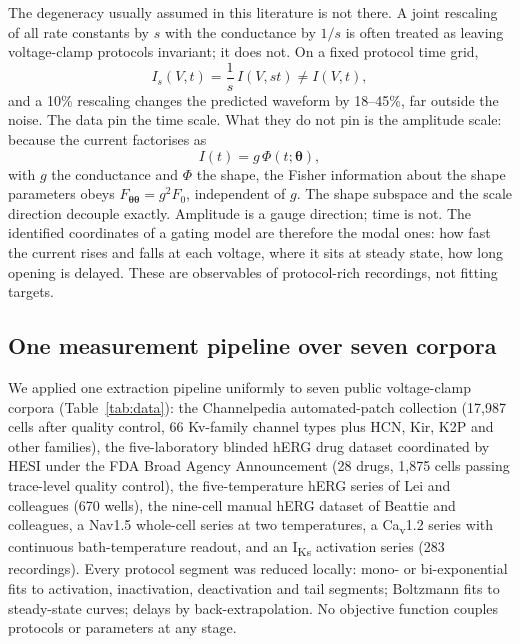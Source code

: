 \documentclass[11pt,a4paper]{article}
\begin{document}
The degeneracy usually assumed in this literature is not there. A joint
rescaling of all rate constants by $s$ with the conductance by $1/s$ is often
treated as leaving voltage-clamp protocols invariant; it does not. On a fixed
protocol time grid,
\begin{equation}
I_s(V,t) = \frac{1}{s}\,I(V,st) \neq I(V,t),
\label{eq:rescale}
\end{equation}
and a 10\% rescaling changes the predicted waveform by 18--45\%, far outside the
noise. The data pin the time scale. What they do not pin is the amplitude scale:
because the current factorises as
\begin{equation}
I(t) = g\,\Phi(t;\boldsymbol{\theta}),
\label{eq:factor}
\end{equation}
with $g$ the conductance and $\Phi$ the shape, the Fisher information about the
shape parameters obeys $F_{\boldsymbol{\theta}\boldsymbol{\theta}} = g^{2}F_{0}$,
independent of $g$. The shape subspace and the scale direction decouple exactly.
Amplitude is a gauge direction; time is not. The identified coordinates of a
gating model are therefore the modal ones: how fast the current rises and falls
at each voltage, where it sits at steady state, how long opening is delayed.
These are observables of protocol-rich recordings, not fitting targets.

\subsection{One measurement pipeline over seven corpora}

We applied one extraction pipeline uniformly to seven public voltage-clamp
corpora (Table~\ref{tab:data}): the Channelpedia automated-patch collection
(17,987 cells after quality control, 66 Kv-family channel types plus HCN, Kir,
K2P and other families), the five-laboratory blinded hERG drug dataset
coordinated by HESI under the FDA Broad Agency Announcement (28 drugs, 1,875
cells passing trace-level quality control), the five-temperature hERG series of
Lei and colleagues (670 wells), the nine-cell manual hERG dataset of Beattie and
colleagues, a Nav1.5 whole-cell series at two temperatures, a Ca\textsubscript{v}1.2
series with continuous bath-temperature readout, and an I\textsubscript{Ks}
activation series (283 recordings). Every protocol segment was reduced locally:
mono- or bi-exponential fits to activation, inactivation, deactivation and tail
segments; Boltzmann fits to steady-state curves; delays by back-extrapolation.
No objective function couples protocols or parameters at any stage.
\end{document}
